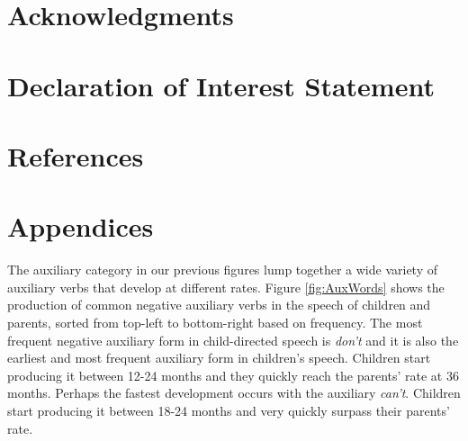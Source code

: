 \documentclass[man,floatsintext,draftall]{apa6}
\begin{document}
\hypertarget{acknowledgments}{%
\section{Acknowledgments}\label{acknowledgments}}

\hypertarget{declaration-of-interest-statement}{%
\section{Declaration of Interest Statement}\label{declaration-of-interest-statement}}

\hypertarget{references}{%
\section{References}\label{references}}

\hypertarget{appendices}{%
\section{Appendices}\label{appendices}}

The auxiliary category in our previous figures lump together a wide variety of auxiliary verbs that develop at different rates. Figure \ref{fig:AuxWords} shows the production of common negative auxiliary verbs in the speech of children and parents, sorted from top-left to bottom-right based on frequency. The most frequent negative auxiliary form in child-directed speech is \emph{don't} and it is also the earliest and most frequent auxiliary form in children's speech. Children start producing it between 12-24 months and they quickly reach the parents' rate at 36 months. Perhaps the fastest development occurs with the auxiliary \emph{can't}. Children start producing it between 18-24 months and very quickly surpass their parents' rate.
\end{document}
